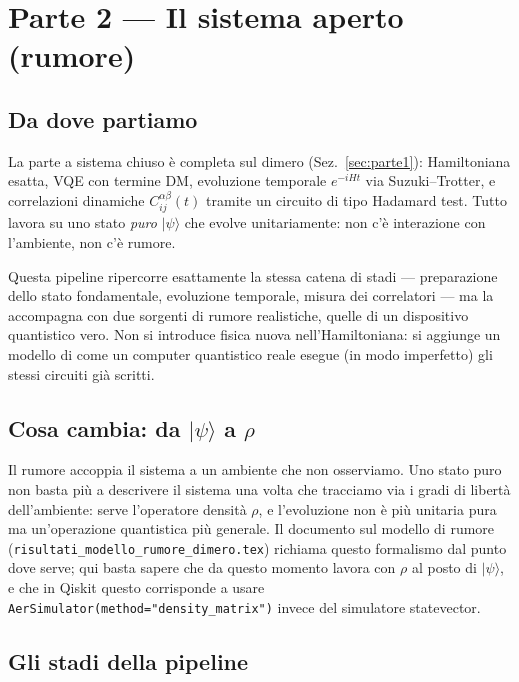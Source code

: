 \documentclass[11pt,a4paper]{article}
\newcommand{\ket}[1]{\lvert #1 \rangle}
\begin{document}
\section{Parte 2 --- Il sistema aperto (rumore)}
\label{sec:parte2}

\subsection{Da dove partiamo}

La parte a sistema chiuso è completa sul dimero (Sez.~\ref{sec:parte1}):
Hamiltoniana esatta,
VQE con termine DM, evoluzione temporale $e^{-iHt}$ via
Suzuki--Trotter, e correlazioni dinamiche $C_{ij}^{\alpha\beta}(t)$
tramite un circuito di tipo Hadamard test. Tutto lavora su uno stato
\emph{puro} $\ket{\psi}$ che evolve unitariamente: non c'è interazione
con l'ambiente, non c'è rumore.

Questa pipeline ripercorre esattamente la stessa catena di stadi ---
preparazione dello stato fondamentale, evoluzione temporale, misura dei
correlatori --- ma la accompagna con due sorgenti di rumore realistiche,
quelle di un dispositivo quantistico vero. Non si introduce fisica nuova
nell'Hamiltoniana: si aggiunge un modello di come un computer quantistico
reale esegue (in modo imperfetto) gli stessi circuiti già scritti.

\subsection{Cosa cambia: da \texorpdfstring{$\ket{\psi}$}{|psi>} a \texorpdfstring{$\rho$}{rho}}

Il rumore accoppia il sistema a un ambiente che non osserviamo. Uno
stato puro non basta più a descrivere il sistema una volta che
tracciamo via i gradi di libertà dell'ambiente: serve l'operatore
densità $\rho$, e l'evoluzione non è più unitaria pura ma un'operazione
quantistica più generale. Il documento sul modello di rumore
(\texttt{risultati\_modello\_\allowbreak rumore\_dimero.tex}) richiama questo
formalismo dal punto dove serve; qui basta sapere che da questo momento
lavora con $\rho$ al posto di $\ket{\psi}$, e che in Qiskit questo
corrisponde a usare
\texttt{AerSimulator(method=\allowbreak"density\_matrix")} invece del
simulatore statevector.

\subsection{Gli stadi della pipeline}
\label{sec:stadi}
\end{document}
